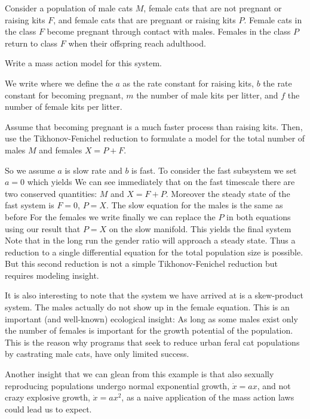 
Consider a population of male cats $M$, female cats that are not pregnant or raising kits $F$, and female cats that are pregnant or raising kits $P$. Female cats in the class $F$ become pregnant through contact with males. Females in the class $P$ return to class $F$ when their offspring reach adulthood. 

\subquestion Write a mass action model for this system. 

\solution 
We write 
where we define the $a$ as the rate constant for raising kits, $b$ the rate constant for becoming pregnant, $m$ the number of male kits per litter, and $f$ the number of female kits per litter. 

\subquestion Assume that becoming pregnant is a much faster process than raising kits. Then, use the Tikhonov-Fenichel reduction to formulate a model for the total number of males $M$ and females $X=P+F$. 

\solution 
So we assume $a$ is slow rate and $b$ is fast. To consider the fast subsystem we set $a=0$ which yields  
We can see immediately that on the fast timescale there are two conserved quantities: $M$ and $X=F+P$. Moreover the steady state of the fast system is 
$F=0$, $P=X$. The slow equation for the males is the same as before 
For the females we write
finally we can replace the $P$ in both equations using our result that $P=X$ on the slow manifold. This yields the final system 
Note that in the long run the gender ratio will approach a steady state. Thus a reduction to a single differential equation for the total population size is possible. But this second reduction is not a simple Tikhonov-Fenichel reduction but requires modeling insight. 

It is also interesting to note that the system we have arrived at is a skew-product system. The males actually do not show up in the female equation. This is an important (and well-known) ecological insight: As long as some males exist only the number of females is important for the growth potential of the population. This is the reason why programs that seek to reduce urban feral cat populations by castrating male cats, have only limited success.  

Another insight that we can glean from this example is that also sexually reproducing populations undergo normal exponential growth, $\dot{x}=ax$, and not crazy explosive growth, $\dot{x}=ax^2$, as a naive application of the mass action laws could lead us to expect. 
